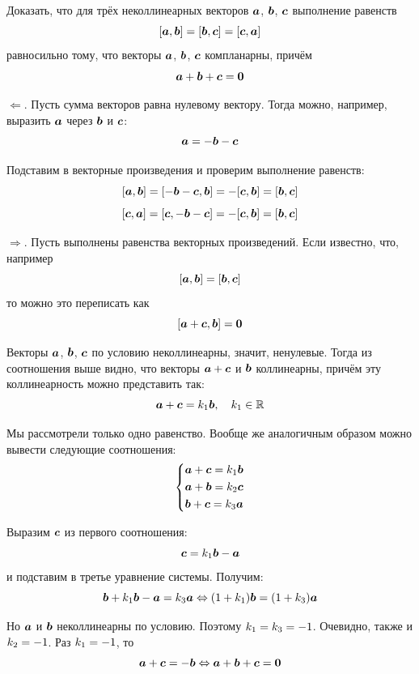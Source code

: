 \documentclass[a4paper,12pt]{article}
\begin{document}
  
  \begin{problem}[3.12]
    Доказать, что для трёх неколлинеарных векторов $\boldsymbol a$, $\boldsymbol b$, $\boldsymbol c$ выполнение равенств
    \[
      [\boldsymbol a, \boldsymbol b] = [\boldsymbol b, \boldsymbol c] = [\boldsymbol c, \boldsymbol a]
    \]
    равносильно тому, что векторы $\boldsymbol a$, $\boldsymbol b$, $\boldsymbol c$ компланарны, причём
    \[
      \boldsymbol a + \boldsymbol b + \boldsymbol c = \boldsymbol 0
    \]
  \end{problem}
  
  \begin{solution}
    \leavevmode
    
    $\Leftarrow$.
    Пусть сумма векторов равна нулевому вектору.
    Тогда можно, например, выразить $\boldsymbol a$ через $\boldsymbol b$ и $\boldsymbol c$:
    \[
      \boldsymbol a = -\boldsymbol b - \boldsymbol c
    \]
    
    Подставим в векторные произведения и проверим выполнение равенств:
    \[
      [\boldsymbol a, \boldsymbol b] = [-\boldsymbol b - \boldsymbol c, \boldsymbol b]
      = -[\boldsymbol c, \boldsymbol b] = [\boldsymbol b, \boldsymbol c]
    \]
    \[
      [\boldsymbol c, \boldsymbol a] = [\boldsymbol c, -\boldsymbol b - \boldsymbol c]
      = -[\boldsymbol c, \boldsymbol b] = [\boldsymbol b, \boldsymbol c]
    \]
    
    \medskip
    
    $\Rightarrow$.
    Пусть выполнены равенства векторных произведений.
    Если известно, что, например
    \[
      [\boldsymbol a, \boldsymbol b] = [\boldsymbol b, \boldsymbol c]
    \]
    то можно это переписать как
    \[
      [\boldsymbol a + \boldsymbol c, \boldsymbol b] = \boldsymbol 0
    \]
    
    Векторы $\boldsymbol a$, $\boldsymbol b$, $\boldsymbol c$ по условию неколлинеарны, значит, ненулевые.
    Тогда из соотношения выше видно, что векторы $\bds a \hm+ \bds c$ и $\boldsymbol b$ коллинеарны, причём эту коллинеарность можно представить так:
    \[
      \boldsymbol a + \boldsymbol c = k_1 \boldsymbol b,\quad k_1 \in \operatorname{\mathbb R}
    \]
    
    Мы рассмотрели только одно равенство.
    Вообще же аналогичным образом можно вывести следующие соотношения:
    \[
      \left\{
        \begin{aligned}
          &\boldsymbol a + \boldsymbol c = k_1 \boldsymbol b\\
          &\boldsymbol a + \boldsymbol b = k_2 \boldsymbol c\\
          &\boldsymbol b + \boldsymbol c = k_3 \boldsymbol a
        \end{aligned}
      \right.
    \]
    
    Выразим $\boldsymbol c$ из первого соотношения:
    \[
      \boldsymbol c = k_1 \boldsymbol b - \boldsymbol a
    \]
    и подставим в третье уравнение системы.
    Получим:
    \[
      \boldsymbol b + k_1 \boldsymbol b - \boldsymbol a = k_3 \boldsymbol a \Leftrightarrow (1 + k_1) \boldsymbol b = (1 + k_3) \boldsymbol a
    \]
    
    Но $\boldsymbol a$ и $\boldsymbol b$ неколлинеарны по условию.
    Поэтому $k_1 \hm= k_3 \hm= -1$.
    Очевидно, также и $k_2 \hm= -1$.
    Раз $k_1 \hm= -1$, то
    \[
      \boldsymbol a + \boldsymbol c = -\boldsymbol b \Leftrightarrow \boldsymbol a + \boldsymbol b + \boldsymbol c = \boldsymbol 0
    \]
  \end{solution}
  
\end{document}
